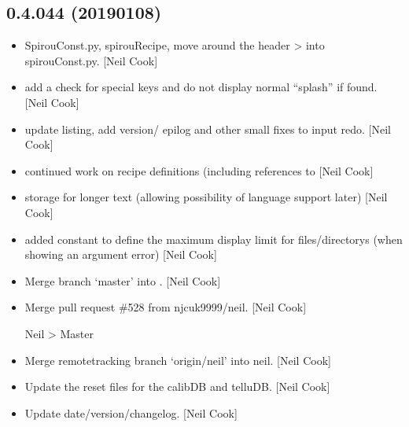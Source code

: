 \documentclass[a4paper,10pt,english]{report}
\begin{document}
\subsection{0.4.044 (2019\sphinxhyphen{}01\sphinxhyphen{}08)}
\label{\detokenize{misc/changelog:id240}}\begin{itemize}
\item {} 
SpirouConst.py, spirouRecipe,  \sphinxhyphen{} move around the
header \textendash{}\textgreater{} into spirouConst.py. {[}Neil Cook{]}

\item {} 
 \sphinxhyphen{} add a check for special keys and do not display
normal “splash” if found. {[}Neil Cook{]}

\item {} 
 \sphinxhyphen{} update listing, add version/ epilog and other small
fixes to input redo. {[}Neil Cook{]}

\item {} 
 \sphinxhyphen{} continued work on recipe definitions (including
references to  {[}Neil Cook{]}

\item {} 
 \sphinxhyphen{} storage for longer text (allowing possibility
of language support later) {[}Neil Cook{]}

\item {} 
 \sphinxhyphen{} added constant to define the maximum display limit
for files/directorys (when showing an argument error) {[}Neil Cook{]}

\item {} 
Merge branch ‘master’ into . {[}Neil Cook{]}

\item {} 
Merge pull request \#528 from njcuk9999/neil. {[}Neil Cook{]}

Neil \textendash{}\textgreater{} Master

\item {} 
Merge remote\sphinxhyphen{}tracking branch ‘origin/neil’ into neil. {[}Neil Cook{]}

\item {} 
Update the reset files for the calibDB and telluDB. {[}Neil Cook{]}

\item {} 
Update date/version/changelog. {[}Neil Cook{]}


\end{itemize}
\end{document}
